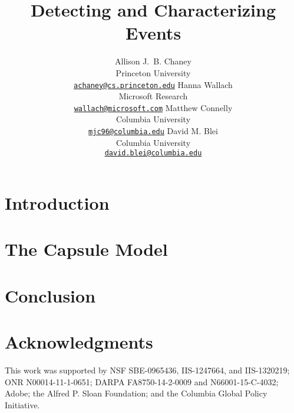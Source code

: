 \documentclass[11pt,letterpaper]{article}
\title{Detecting and Characterizing Events}
\author{
Allison J.~B. Chaney\\
    Princeton University\\
	\href{mailto:achaney@cs.princeton.edu}{\nolinkurl{achaney@cs.princeton.edu}}
\And
Hanna Wallach\\
    Microsoft Research\\
    \href{mailto:wallach@microsoft.com}{\nolinkurl{wallach@microsoft.com}}
\AND
Matthew Connelly\\
    Columbia University\\
    \href{mailto:mjc96@columbia.edu}{\nolinkurl{mjc96@columbia.edu}}
\And
David M. Blei\\
    Columbia University\\
    \href{mailto:david.blei@columbia.edu}{\nolinkurl{david.blei@columbia.edu}}
}
\date{}
\begin{document}
\maketitle

\begin{abstract}

\end{abstract}


\section{Introduction}
\label{sec:intro}


\section{The Capsule Model}
\label{sec:model}




\section{Conclusion}
\label{sec:discussion}



\section*{Acknowledgments}
This work was supported by NSF SBE-0965436, IIS-1247664, and
IIS-1320219; ONR N00014-11-1-0651; DARPA FA8750-14-2-0009 and
N66001-15-C-4032; Adobe; the Alfred P. Sloan Foundation; and 
the Columbia Global Policy Initiative.




\end{document}
